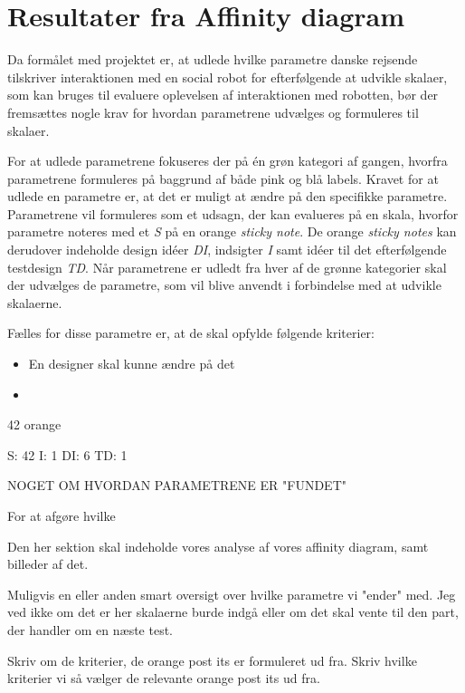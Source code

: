 \section{Resultater fra Affinity diagram}
\label{ParametreDatabehandlingAffinityDiagram}
%
Da formålet med projektet er, at udlede hvilke parametre danske rejsende tilskriver interaktionen med en social robot for efterfølgende at udvikle skalaer, som kan bruges til evaluere oplevelsen af interaktionen med robotten, bør der fremsættes nogle krav for hvordan parametrene udvælges og formuleres til skalaer. 

For at udlede parametrene fokuseres der på én grøn kategori af gangen, hvorfra parametrene formuleres på baggrund af både pink og blå labels. Kravet for at udlede en parametre er, at det er muligt at ændre på den specifikke parametre. Parametrene vil formuleres som et udsagn, der kan evalueres på en skala, hvorfor parametre noteres med et \textit{S} på en orange \textit{sticky note}. De orange \textit{sticky notes} kan derudover indeholde design idéer \textit{DI}, indsigter \textit{I} samt idéer til det efterfølgende testdesign \textit{TD}. Når parametrene er udledt fra hver af de grønne kategorier skal der udvælges de parametre, som vil blive anvendt i forbindelse med at udvikle skalaerne. 

Fælles for disse parametre er, at de skal opfylde følgende kriterier: \blankline
%
\begin{itemize}
  \item En designer skal kunne ændre på det
  \item 
\end{itemize}


 42 orange
 
 S: 42
 I: 1
 DI: 6
 TD: 1


NOGET OM HVORDAN PARAMETRENE ER "FUNDET" 

For at afgøre hvilke 

Den her sektion skal indeholde vores analyse af vores affinity diagram, samt billeder af det. 

Muligvis en eller anden smart oversigt over hvilke parametre vi "ender" med. Jeg ved ikke om det er her skalaerne burde indgå eller om det skal vente til den part, der handler om en næste test. 

Skriv om de kriterier, de orange post its er formuleret ud fra. Skriv hvilke kriterier vi så vælger de relevante orange post its ud fra. 

